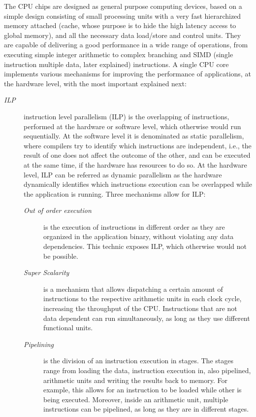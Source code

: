 The CPU chips are designed as general purpose computing devices, based on a simple design consisting of small processing units with a very fast hierarchized memory attached (cache, whose purpose is to hide the high latency access to global memory), and all the necessary data load/store and control units. They are capable of delivering a good performance in a wide range of operations, from executing simple integer arithmetic to complex branching and SIMD (single instruction multiple data, later explained) instructions. A single CPU core implements various mechanisms for improving the performance of applications, at the hardware level, with the most important explained next:

\begin{description}
	\item[\textit{ILP}] instruction level parallelism (ILP) is the overlapping of instructions, performed at the hardware or software level, which otherwise would run sequentially. At the software level it is denominated as static parallelism, where compilers try to identify which instructions are independent, i.e., the result of one does not affect the outcome of the other, and can be executed at the same time, if the hardware has resources to do so. At the hardware level, ILP can be referred as dynamic parallelism as the hardware dynamically identifies which instructions execution can be overlapped while the application is running. Three mechanisms allow for ILP:
	\begin{description}
		\item[\textit{Out of order execution}] is the execution of instructions in different order as they are organized in the application binary, without violating any data dependencies. This technic exposes ILP, which otherwise would not be possible.
		\item[\textit{Super Scalarity}] is a mechanism that allows dispatching a certain amount of instructions to the respective arithmetic units in each clock cycle, increasing the throughput of the CPU. Instructions that are not data dependent can run simultaneously, as long as they use different functional units.
		\item[\textit{Pipelining}] is the division of an instruction execution in stages. The stages range from loading the data, instruction execution in, also pipelined, arithmetic units and writing the results back to memory. For example, this allows for an instruction to be loaded while other is being executed. Moreover, inside an arithmetic unit, multiple instructions can be pipelined, as long as they are in different stages.

\end{description}
\end{description}
